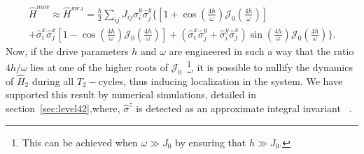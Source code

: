 \documentclass[12pt]{iopart}
\begin{document}
\begin{multline}
\hat{H}^{mov}\approx \hat{H}^{_{RWA}} = \frac{\hbar}{2}\sum_{ij} J_{ij} \hat{\sigma}^y_i\hat{\sigma}^y_j\Bigg\{\left[1+\cos(\frac{4h}{\omega})\mathcal{J}_0\left(\frac{4h}{\omega}\right)\right] \\
+ \hat{\sigma}^x_i\hat{\sigma}^x_j \left[1-\cos(\frac{4h}{\omega})\mathcal{J}_0\left(\frac{4h}{\omega}\right)\right]
+ \left(\hat{\sigma}^x_i\hat{\sigma}^y_j+\hat{\sigma}^y_i\hat{\sigma}^x_j\right)\sin(\frac{4h}{\omega})\mathcal{J}_0\left(\frac{4h}{\omega}\right) \Bigg\}.
\label{eq:movham1}
\end{multline}
Now, if the drive parameters $h$ and $\omega$  are engineered in such a way that the ratio ${4h}/{\omega}$ lies at one of the higher roots of $\mathcal{J}_0$~\footnote{This can be achieved when $\omega \gg J_0$ by ensuring that $h\gg J_0$.}, it is possible to nullify the dynamics of $\hat{H}_2$ during all $T_2-$cycles, thus inducing localization in the system. We have supported this result by numerical simulations, detailed in section~\ref{sec:level42},where, $\hat{\sigma}^z$ is detected as an approximate integral invariant ~\cite{Keser2016,Dodonov1978}. 
\end{document}
